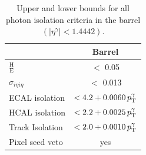 
\begin{table}[bt]
\caption{Upper and lower bounds for all photon isolation criteria in the barrel $\left( |\eta^{\gamma}|<1.4442 \right)$.}
\renewcommand{\arraystretch}{1.5}
\begin{center}
\begin{tabular}{ l| c |}
                              & Barrel                            \\\hline
$\frac{\text{H}}{\text{E}}$   & $<$ 0.05                          \\\hline
$\sigma_{i\eta i \eta}$       & $<$ 0.013                         \\\hline
ECAL isolation                & $<4.2 + 0.0060 \, p_{\text{T}}^{\gamma}$   \\\hline
HCAL isolation                & $<2.2 + 0.0025 \, p_{\text{T}}^{\gamma}$   \\\hline
Track Isolation               & $<2.0 + 0.0010 \, p_{\text{T}}^{\gamma}$   \\\hline
Pixel seed veto               & yes                               \\\hline
\end{tabular}
\end{center}
\label{res:tab:PhotonIsolation}
\end{table}

